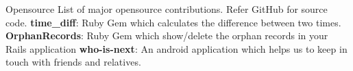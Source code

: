 \documentclass{resume}
\begin{document}
\begin{category}{Opensource}
  \citemnobullet List of major opensource contributions. Refer GitHub for source code.
  \citembullet \textbf{time\_diff}: Ruby Gem which calculates the difference between two times.
  \citembullet \textbf{OrphanRecords}: Ruby Gem which show/delete the orphan records in your Rails application
  \citembullet \textbf{who-is-next}: An android application which helps us to keep in touch with friends and relatives.
\end{category}


\end{document}
